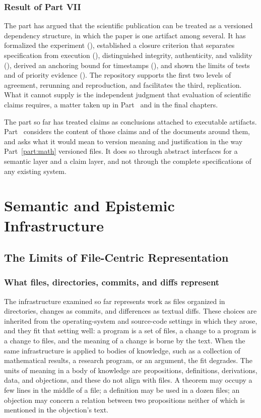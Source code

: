 \documentclass[11pt,twoside,openright]{book}
\theoremstyle{plain}
\theoremstyle{definition}
\theoremstyle{remark}
\begin{document}
\section{Result of Part VII}

The part has argued that the scientific publication can be treated as a versioned dependency structure, in which the paper is one artifact among several. It has formalized the experiment (), established a closure criterion that separates specification from execution (), distinguished integrity, authenticity, and validity (), derived an anchoring bound for timestamps (), and shown the limits of tests and of priority evidence (). The repository supports the first two levels of agreement, rerunning and reproduction, and facilitates the third, replication. What it cannot supply is the independent judgment that evaluation of scientific claims requires, a matter taken up in Part~\ref{part:semantic} and in the final chapters.

The part so far has treated claims as conclusions attached to executable artifacts. Part~\ref{part:semantic} considers the content of those claims and of the documents around them, and asks what it would mean to version meaning and justification in the way Part~\ref{part:math} versioned files. It does so through abstract interfaces for a semantic layer and a claim layer, and not through the complete specifications of any existing system.

\part{Semantic and Epistemic Infrastructure}\label{part:semantic}

\chapter{The Limits of File-Centric Representation}\label{ch:filelimits}

\section{What files, directories, commits, and diffs represent}

The infrastructure examined so far represents work as files organized in directories, changes as commits, and differences as textual diffs. These choices are inherited from the operating-system and source-code settings in which they arose, and they fit that setting well: a program is a set of files, a change to a program is a change to files, and the meaning of a change is borne by the text. When the same infrastructure is applied to bodies of knowledge, such as a collection of mathematical results, a research program, or an argument, the fit degrades. The units of meaning in a body of knowledge are propositions, definitions, derivations, data, and objections, and these do not align with files. A theorem may occupy a few lines in the middle of a file; a definition may be used in a dozen files; an objection may concern a relation between two propositions neither of which is mentioned in the objection's text.
\end{document}
